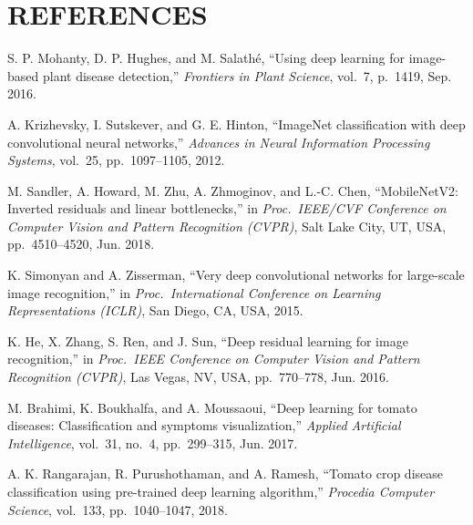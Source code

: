 \documentclass[12pt,a4paper]{report}
\begin{document}
\chapter{REFERENCES}

\begin{enumerate}[label={[\arabic*]}, leftmargin=1.5cm, itemsep=6pt]

\item S. P. Mohanty, D. P. Hughes, and M. Salath\'{e}, ``Using deep learning for image-based plant disease detection,'' \textit{Frontiers in Plant Science}, vol.~7, p.~1419, Sep. 2016.

\item A. Krizhevsky, I. Sutskever, and G. E. Hinton, ``ImageNet classification with deep convolutional neural networks,'' \textit{Advances in Neural Information Processing Systems}, vol.~25, pp.~1097--1105, 2012.

\item M. Sandler, A. Howard, M. Zhu, A. Zhmoginov, and L.-C. Chen, ``MobileNetV2: Inverted residuals and linear bottlenecks,'' in \textit{Proc.\ IEEE/CVF Conference on Computer Vision and Pattern Recognition (CVPR)}, Salt Lake City, UT, USA, pp.~4510--4520, Jun. 2018.

\item K. Simonyan and A. Zisserman, ``Very deep convolutional networks for large-scale image recognition,'' in \textit{Proc.\ International Conference on Learning Representations (ICLR)}, San Diego, CA, USA, 2015.

\item K. He, X. Zhang, S. Ren, and J. Sun, ``Deep residual learning for image recognition,'' in \textit{Proc.\ IEEE Conference on Computer Vision and Pattern Recognition (CVPR)}, Las Vegas, NV, USA, pp.~770--778, Jun. 2016.

\item M. Brahimi, K. Boukhalfa, and A. Moussaoui, ``Deep learning for tomato diseases: Classification and symptoms visualization,'' \textit{Applied Artificial Intelligence}, vol.~31, no.~4, pp.~299--315, Jun. 2017.

\item A. K. Rangarajan, R. Purushothaman, and A. Ramesh, ``Tomato crop disease classification using pre-trained deep learning algorithm,'' \textit{Procedia Computer Science}, vol.~133, pp.~1040--1047, 2018.


\end{enumerate}
\end{document}
